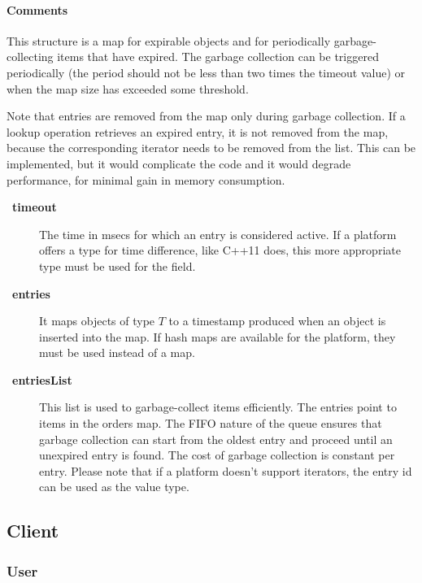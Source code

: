 \documentclass[a4paper,10pt]{article}
\let\Item\item
\newcommand\SpecialItem{\renewcommand\item[1][]{\Item[\textbullet~\bfseries##1]}
}
\begin{document}
\begin{inparaitem}[ ]
 \item \infrastructure
\end{inparaitem}

\paragraph*{Comments}
This structure is a map for expirable objects and for periodically garbage-collecting items that have expired. The garbage collection can be triggered periodically (the period 
should not be less than two times the timeout value) or when the map size has exceeded some threshold.

Note that entries are removed from the map only during garbage collection. If a lookup operation retrieves an expired entry, it is not removed from the map, because the 
corresponding iterator needs to be removed from the list. This can be implemented, but it would complicate the code and it would degrade performance, for minimal gain in memory 
consumption.

\SpecialItem
\begin{description}
 \item[timeout] The time in msecs for which an entry is considered active. If a platform offers a type for time difference, like C++11 does, this more appropriate type must be 
used for the field.
 \item[entries] It maps objects of type $T$ to a timestamp produced when an object is inserted into the map. If hash maps are available for the platform, they must be used instead 
of a map.
 \item[entriesList] This list is used to garbage-collect items efficiently. The entries point to items in the orders map. The FIFO nature of the queue ensures that garbage 
collection can start from the oldest entry and proceed until an unexpired entry is found. The cost of garbage collection is constant per entry. Please note that if a platform 
doesn't support iterators, the entry id can be used as the value type.
\end{description}

\subsection{Client}
\label{sec:structure:client}

\subsubsection{User}
\end{document}
